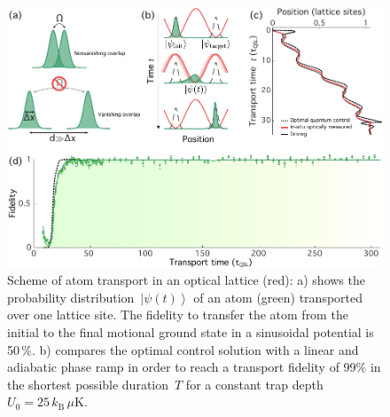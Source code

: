 \documentclass[aps,pra,reprint,a4paper,nofootinbib,superscriptaddress,numbers,longbibliography,showpacs,showkeys,floatfix]{revtex4-1}
\def\ket#1{\left|#1\right\rangle}
\begin{document}
\begin{figure}
	\centering
	\includegraphics[width=\textwidth]{figure1}
	\caption[]{Scheme of atom transport in an optical lattice (red): a) shows the probability distribution~$\ket{\psi(t)}$ of an atom (green) transported over one lattice site. The fidelity to transfer the atom from the initial to the final motional ground state in a sinusoidal potential is 50$\,\%$. b) compares the optimal control solution with a linear and adiabatic phase ramp in order to reach a transport fidelity of 99$\%$ in the shortest possible duration~$T$ for a constant trap depth~$U_0 = 25\,k_{\text{B}}\, \mu$K.}
	\label{Fig:Transport_Ramp}
\end{figure}
 
\end{document}
